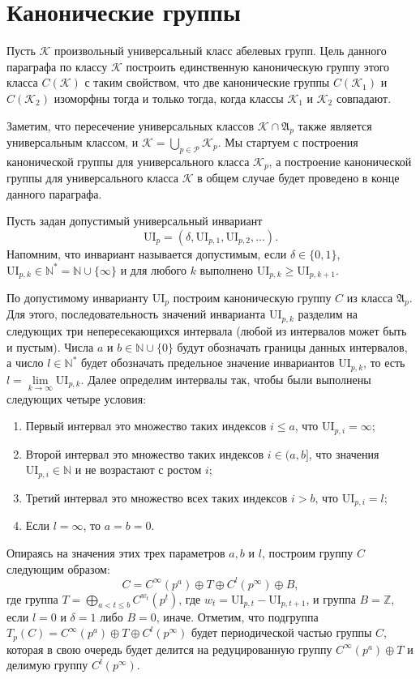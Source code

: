 \documentclass[a4paper,11pt,twoside]{article}
\def\A{{\mathfrak{A}}}
\def\K{{\mathcal{K}}}
\def\P{{\mathcal{P}}}
\def\Z{{\mathbb{Z}}}
\def\N{{\mathbb{N}}}
\def\ui{{\mathrm{UI}}}
\begin{document}
\section{Канонические группы}\label{sec:CannonicalGroups}

Пусть $\K$ произвольный универсальный класс абелевых групп. Цель данного параграфа по классу $\K$ построить единственную каноническую группу этого класса $C(\K)$ с таким свойством, что две канонические группы $C(\K_1)$ и $C(\K_2)$ изоморфны тогда и только тогда, когда классы $\K_1$ и $\K_2$ совпадают.

Заметим, что пересечение универсальных классов $\K \cap \A_p$ также является универсальным классом, и $\K = \bigcup\limits_{p \in \P} \K_p$. Мы стартуем с построения канонической группы для универсального класса $\K_p$, а построение канонической группы для универсального класса $\K$ в общем случае будет проведено в конце данного параграфа.

Пусть задан допустимый универсальный инвариант 
$$\ui_p = (\delta, \ui_{p,1}, \ui_{p,2}, \ldots).$$
Напомним, что инвариант называется допустимым, если $\delta \in \{0,1\}$, $\ui_{p,k} \in \N^* = \N \cup \{\infty\}$ и для любого $k$ выполнено $\ui_{p,k} \geq \ui_{p, k+1}$.

По допустимому инварианту $\ui_p$ построим каноническую группу $C$ из класса $\A_p$. Для этого, последовательность значений инварианта $\ui_{p,k}$ разделим на следующих три непересекающихся интервала (любой из интервалов может быть и пустым). Числа $a$ и $b \in \N \cup \{0\}$ будут обозначать границы данных интервалов, а число $l \in \N^*$ будет обозначать предельное значение инвариантов $\ui_{p,k}$, то есть $l = \lim\limits_{k \rightarrow \infty} \ui_{p,k}$. Далее определим интервалы так, чтобы были выполнены следующих четыре условия:
\begin{enumerate}
\item Первый интервал это множество таких индексов $i \leq a$, что $\ui_{p,i} = \infty$;
\item Второй интервал это множество таких индексов $i \in (a, b]$, что значения $\ui_{p,i} \in \N$ и не возрастают с ростом $i$;
\item Третий интервал это множество всех таких индексов $i > b$, что $\ui_{p,i} = l$;
\item Если $l = \infty$, то $a = b = 0$.
\end{enumerate}

Опираясь на значения этих трех параметров $a, b$ и $l$, построим группу $C$ следующим образом:
$$C = C^\infty(p^a) \oplus T \oplus C^l(p^\infty) \oplus B ,$$
где группа $T = \bigoplus\limits_{ a < t \leq b} C^{w_t}(p^t)$, где $w_t = \ui_{p,t} - \ui_{p,t+1}$, и группа $B = \Z$, если $l = 0$ и $\delta = 1$ либо $B = 0$, иначе. Отметим, что подгруппа $T_p(C) = C^\infty(p^a) \oplus T \oplus C^l(p^\infty)$ будет периодической частью группы $C$, которая в свою очередь будет делится на редуцированную группу $C^\infty(p^a) \oplus T$ и делимую группу $C^l(p^\infty)$.
\end{document}
